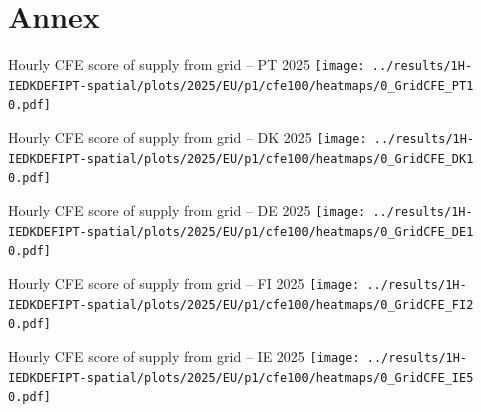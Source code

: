 
\section*{Annex}


\begin{frame}{Hourly CFE score of supply from grid -- PT 2025}
  \vspace{.5cm}
  \texttt{[image: ../results/1H-IEDKDEFIPT-spatial/plots/2025/EU/p1/cfe100/heatmaps/0\_GridCFE\_PT1 0.pdf]}
\end{frame}

\begin{frame}{Hourly CFE score of supply from grid -- DK 2025}
  \vspace{.5cm}
  \texttt{[image: ../results/1H-IEDKDEFIPT-spatial/plots/2025/EU/p1/cfe100/heatmaps/0\_GridCFE\_DK1 0.pdf]}
\end{frame}

\begin{frame}{Hourly CFE score of supply from grid -- DE 2025}
  \vspace{.5cm}
  \texttt{[image: ../results/1H-IEDKDEFIPT-spatial/plots/2025/EU/p1/cfe100/heatmaps/0\_GridCFE\_DE1 0.pdf]}
\end{frame}

\begin{frame}{Hourly CFE score of supply from grid -- FI 2025}
  \vspace{.5cm}
  \texttt{[image: ../results/1H-IEDKDEFIPT-spatial/plots/2025/EU/p1/cfe100/heatmaps/0\_GridCFE\_FI2 0.pdf]}
\end{frame}

\begin{frame}{Hourly CFE score of supply from grid -- IE 2025}
  \vspace{.5cm}
  \texttt{[image: ../results/1H-IEDKDEFIPT-spatial/plots/2025/EU/p1/cfe100/heatmaps/0\_GridCFE\_IE5 0.pdf]}
\end{frame}





